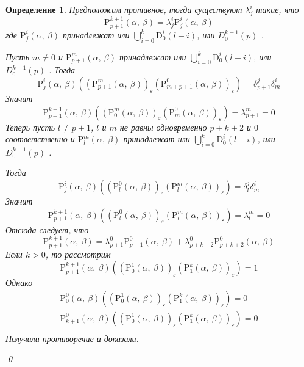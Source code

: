 \documentclass[12pt, reqno, a4paper, oneside, notitlepage]{amsart}
\makeatletter
\theoremstyle{mytheoremstyle}
\theoremstyle{myremarkstyle}
\newtheorem{definition}[theorem]{Определение}
\numberwithin{equation}{section}
\renewenvironment{proof}[1][\proofname]{\par\indent {\bfseries #1\@addpunct{.} }}{\qed}
\makeatother
\begin{document}
\begin{definition}
\begin{proof}
  Предположим противное, тогда существуют $\lambda^i_j$ такие, что 
  \[
	\mathrm{P}^{k+1}_{p+1}(\alpha,\ \beta) = \lambda^i_j\mathrm{P}^i_j(\alpha,\ \beta)
  \]
  где $\mathrm{P}^{i}_j(\alpha,\ \beta)$ принадлежат 
  или $\bigcup\limits_{i=0}^k\mathrm{D}^i_0(l-i)$, или  $D^{k+1}_0(p)$ .

  Пусть $m \neq 0$ и $\mathrm{P}^m_{p+1}(\alpha,\ \beta)$ принадлежат 
  или $\bigcup\limits_{i=0}^k\mathrm{D}^i_0(l-i)$, или  $D^{k+1}_0(p)$ .
  Тогда \[
	\mathrm{P}^{i}_j(\alpha,\ \beta)\left(
	\left(\mathrm{P}^m_{p+1}(\alpha,\ \beta)\right)_\varepsilon
	\left(\mathrm{P}^0_{m+p+1}(\alpha,\ \beta)\right)_\varepsilon\right)  = 
	\delta^j_{p+1}\delta^i_m
  \]
  Значит  \[
  \mathrm{P}^{k+1}_{p+1}(\alpha,\ \beta)\left(
  \left(\mathrm{P}^m_0(\alpha,\ \beta)\right)_\varepsilon
  \left(\mathrm{P}^0_m(\alpha,\ \beta)\right)_\varepsilon\right) = 
  \lambda^m_{p+1} = 0
  \]
  Теперь пусть $l \neq p+1$, $l$ и $m$ не равны одновременно 
  $p+k+2$ и $0$ соответственно и 
  $\mathrm{P}^{m}_l(\alpha,\ \beta)$ принадлежат 
  или $\bigcup\limits_{i=0}^k\mathrm{D}^i_0(l-i)$, или  $D^{k+1}_0(p)$ .

  Тогда \[
	\mathrm{P}^{i}_j(\alpha,\ \beta)\left(\left(\mathrm{P}^0_l(\alpha,\ \beta)\right)_\varepsilon\left(\mathrm{P}^m_l(\alpha,\ \beta)\right)_\varepsilon\right)  = \delta^j_l\delta^i_m
  \]
  Значит  \[
	\mathrm{P}^{k+1}_{p+1}(\alpha,\ \beta)\left(\left(\mathrm{P}^0_l(\alpha,\ \beta)\right)_\varepsilon\left(\mathrm{P}^m_l(\alpha,\ \beta)\right)_\varepsilon\right) = \lambda^m_l = 0
  \]
  Отсюда следует, что 
  \[
	\mathrm{P}^{k+1}_{p+1}(\alpha,\ \beta) = \lambda^0_{p+1}\mathrm{P}^0_{p+1}(\alpha,\ \beta) + \lambda^0_{p+k+2}\mathrm{P}^0_{p+k+2}(\alpha,\ \beta)
  \]
  Если $k > 0$, то рассмотрим 
  \[
	\mathrm{P}^{k+1}_{p+1}(\alpha,\ \beta)\left(\left(\mathrm{P}^1_0(\alpha,\ \beta)\right)_\varepsilon\left(\mathrm{P}^k_1(\alpha,\ \beta)\right)_\varepsilon\right) = 1
  \]
  Однако 
  \begin{eqnarray*}
	\mathrm{P}^0_0(\alpha,\ \beta)\left(\left(\mathrm{P}^1_0(\alpha,\ \beta)\right)_\varepsilon\left(\mathrm{P}^k_1(\alpha,\ \beta)\right)_\varepsilon\right) = 0\\
	\mathrm{P}^0_{k+1}(\alpha,\ \beta)\left(\left(\mathrm{P}^1_0(\alpha,\ \beta)\right)_\varepsilon\left(\mathrm{P}^k_1(\alpha,\ \beta)\right)_\varepsilon\right) = 0\\
  \end{eqnarray*}
  Получили противоречие и доказали.


\end{proof}
\end{definition}
\end{document}
